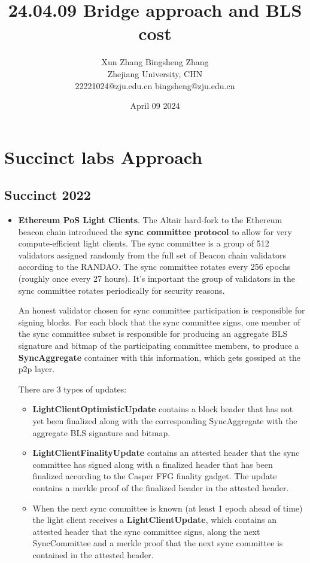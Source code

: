 \documentclass{article}
\title{24.04.09 Bridge approach and BLS cost}
\author{Xun Zhang \quad \quad Bingsheng Zhang \\ 
Zhejiang University, CHN \\
22221024@zju.edu.cn \quad bingsheng@zju.edu.cn}
\date{April 09 2024}
\begin{document}
\maketitle

\section{Succinct labs Approach}

\subsection{Succinct 2022}
\begin{itemize}
    \item \textbf{Ethereum PoS Light Clients}. The Altair hard-fork to the Ethereum beacon chain introduced the \textbf{sync committee protocol} to allow for very compute-efficient light clients. The sync committee is a group of 512 validators assigned randomly from the full set of Beacon chain validators according to the RANDAO. The sync committee rotates every 256 epochs (roughly once every 27 hours). It's important the group of validators in the sync committee rotates periodically for security reasons.

    An honest validator chosen for sync committee participation is responsible for signing blocks. For each block that the sync committee signs, one member of the sync committee subset is responsible for producing an aggregate BLS signature and bitmap of the participating committee members, to produce a \textbf{SyncAggregate} container with this information, which gets gossiped at the p2p layer.

    There are 3 types of updates:
    \begin{itemize}
        \item \textbf{LightClientOptimisticUpdate} contains a block header that has not yet been finalized along with the corresponding SyncAggregate with the aggregate BLS signature and bitmap.
        \item \textbf{LightClientFinalityUpdate} contains an attested header that the sync committee has signed along with a finalized header that has been finalized according to the Casper FFG finality gadget. The update contains a merkle proof of the finalized header in the attested header.
        \item When the next sync committee is known (at least 1 epoch ahead of time) the light client receives a \textbf{LightClientUpdate}, which contains an attested header that the sync committee signs, along the next SyncCommittee and a merkle proof that the next sync committee is contained in the attested header.
    \end{itemize} 




\end{itemize}
\end{document}
